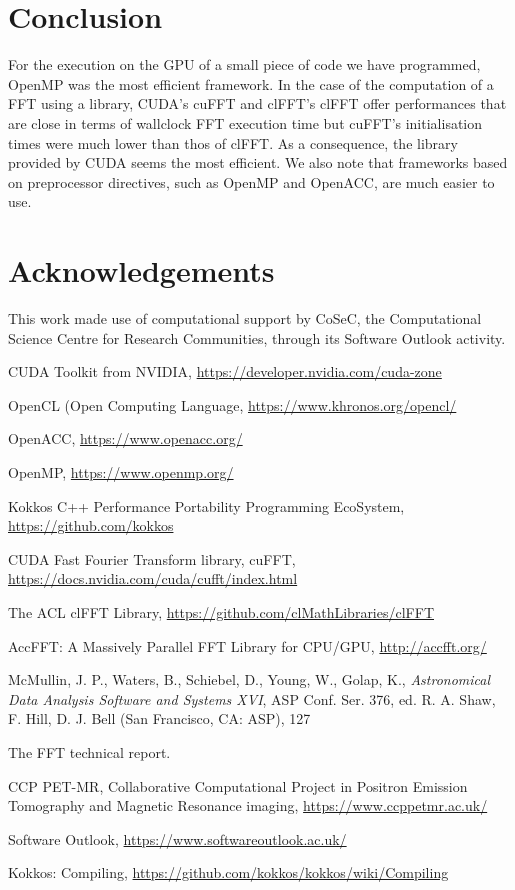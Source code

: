 \documentclass[12pt, a4paper]{article}
\begin{document}
\section{Conclusion}
For the execution on the GPU of a small piece of code we have
programmed, OpenMP was the most efficient framework. In the case of
the computation of a FFT using a library, CUDA's cuFFT and clFFT's
clFFT offer performances that are close in terms of wallclock FFT
execution time but cuFFT's initialisation times were much lower than
thos of clFFT. As a consequence, the library provided by CUDA seems
the most efficient. We also note that frameworks based on preprocessor
directives, such as OpenMP and OpenACC, are much easier to use.

\section*{Acknowledgements}
This work made use of computational support by CoSeC, the
Computational Science Centre for Research Communities, through its
Software Outlook activity.

\begin{thebibliography}{9}

 CUDA Toolkit from NVIDIA, \url{https://developer.nvidia.com/cuda-zone}

 OpenCL (Open Computing Language, \url{https://www.khronos.org/opencl/}

 OpenACC, \url{https://www.openacc.org/}
  
 OpenMP, \url{https://www.openmp.org/}

 Kokkos C++ Performance Portability Programming EcoSystem,
\url{https://github.com/kokkos}

 CUDA Fast Fourier Transform library, cuFFT, \url{https://docs.nvidia.com/cuda/cufft/index.html}

 The ACL clFFT Library, \url{https://github.com/clMathLibraries/clFFT}
  
 AccFFT: A Massively Parallel FFT Library for CPU/GPU, \url{http://accfft.org/}

 McMullin, J. P., Waters, B., Schiebel, D., Young, W., Golap, K.,
{\it Astronomical Data Analysis Software and Systems XVI},
ASP Conf. Ser. 376, ed. R. A. Shaw, F. Hill, D. J. Bell (San Francisco, CA: ASP), 127

 The FFT technical report.

 CCP PET-MR, Collaborative Computational Project in Positron Emission Tomography and Magnetic Resonance imaging, \url{https://www.ccppetmr.ac.uk/}

 Software Outlook, \url{https://www.softwareoutlook.ac.uk/}

 Kokkos: Compiling, \url{https://github.com/kokkos/kokkos/wiki/Compiling}

\end{thebibliography}
\end{document}
